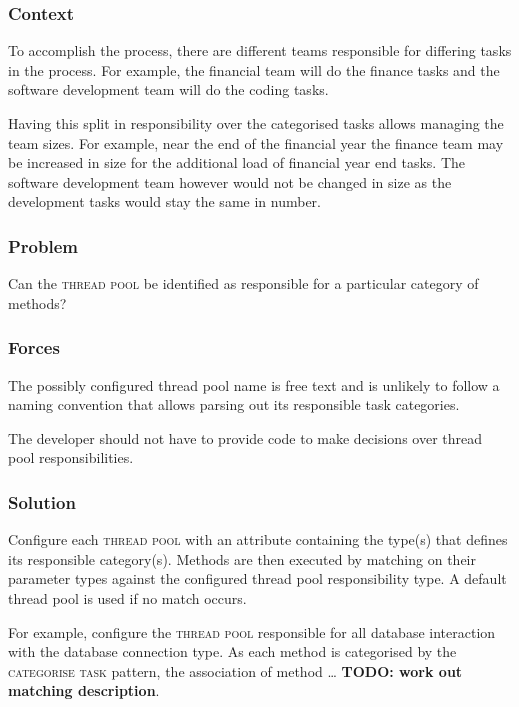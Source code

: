 \documentclass[prodmode]{style/acmlarge}
\begin{document}
\subsubsection*{Context}

To accomplish the process, there are different teams responsible for differing
tasks in the process.  For example, the financial team will do the finance tasks
and the software development team will do the coding tasks.

Having this split in responsibility over the categorised tasks allows managing
the team sizes.  For example, near the end of the financial year the finance
team may be increased in size for the additional load of financial year end
tasks.  The software development team however would not be changed in size as
the development tasks would stay the same in number.

\subsubsection*{Problem}

Can the \textsc{thread pool} be identified as responsible for a particular
category of methods?

\subsubsection*{Forces}

The possibly configured thread pool name is free text and is unlikely
to follow a naming convention that allows parsing out its responsible task
categories.

The developer should not have to provide code to make decisions over thread pool
responsibilities.

\subsubsection*{Solution}

Configure each \textsc{thread pool} with an attribute containing the type(s)
that defines its responsible category(s).  Methods are then executed by matching
on their parameter types against the configured thread pool responsibility type.
 A default thread pool is used if no match occurs.

For example, configure the \textsc{thread pool} responsible for all database
interaction with the database connection type.  As each method is categorised by
the \textsc{categorise task} pattern, the association of method \ldots
\textbf{TODO: work out matching description}.
\end{document}
